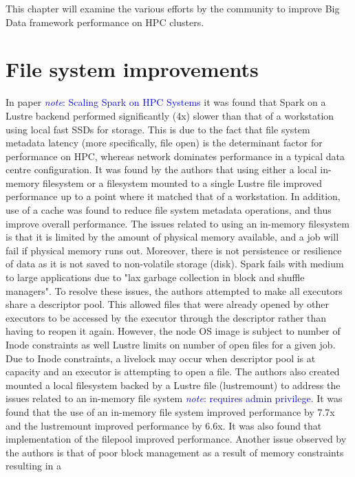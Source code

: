 \documentclass{report}
\newcommand{\note}[1]{\textcolor{blue}{\textit{note}: #1}}
\begin{document}
    This chapter will examine the various efforts by the community to improve
    Big Data framework performance on HPC clusters.
	
    \section{File system improvements}
	

    In paper \note{Scaling Spark on HPC Systems} it was found that Spark on a
    Lustre backend performed significantly (4x) slower than that of a
    workstation using local fast SSDs for storage. This is due to the fact that
    file system metadata latency (more specifically, file open) is the
    determinant factor for performance on HPC, whereas network dominates
    performance in a typical data centre configuration. It was found by the
    authors that using either a local in-memory filesystem or a filesystem
    mounted to a single Lustre file improved performance up to a point where it
    matched that of a workstation. In addition, use of a cache was found to
    reduce file system metadata operations, and thus improve overall
    performance.  The issues related to using an in-memory filesystem is that it
    is limited by the amount of physical memory available, and a job will fail
    if physical memory runs out. Moreover, there is not persistence or
    resilience of data as it is not saved to non-volatile storage (disk). Spark
    fails with medium to large applications due to "lax garbage collection in
    block and shuffle managers". To resolve these issues, the authors attempted
    to make all executors share a descriptor pool. This allowed files that were
    already opened by other executors to be accessed by the executor through the
    descriptor rather than having to reopen it again. However, the node OS image
    is subject to number of Inode constraints as well Lustre limits on number of
    open files for a given job. Due to Inode constraints, a livelock may occur
    when descriptor pool is at capacity and an executor is attempting to open a
    file. The authors also created mounted a local filesystem backed by a Lustre
    file (lustremount) to address the issues related to an in-memory file system
    \note{requires admin privilege}. It was found that the use of an in-memory
    file system improved performance by 7.7x and the lustremount improved
    performance by 6.6x. It was also found that implementation of the filepool
    improved performance.  Another issue observed by the authors is that of poor
    block management as a result of memory constraints resulting in a
\end{document}
